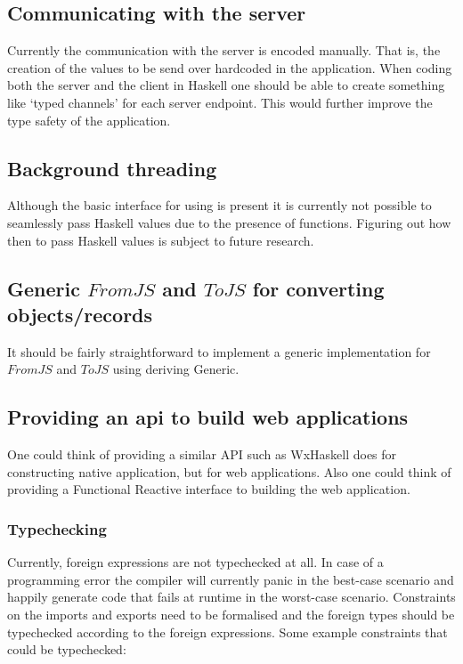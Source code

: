 \documentclass{llncs}
\newcommand{\Conid}[1]{\mathit{#1}}
\begin{document}
\label{future}

\subsection{Communicating with the server}\label{ssec:communicating-with-server}
Currently the communication with the server is encoded manually. That is, the
creation of the \js values to be send over hardcoded in the application. When
coding both the server and the client in Haskell one should be able to create
something like `typed channels' for each server endpoint. This would further
improve the type safety of the application.

\subsection{Background threading}
Although the basic interface for using  is present it is
currently not possible to seamlessly pass Haskell values due to the presence
of functions. Figuring out how then to pass Haskell values is subject to
future research.

\subsection{Generic \ensuremath{\Conid{FromJS}} and \ensuremath{\Conid{ToJS}} for converting objects/records}
It should be fairly straightforward to implement a generic implementation for
\ensuremath{\Conid{FromJS}} and \ensuremath{\Conid{ToJS}} using deriving Generic.

\subsection{Providing an api to build web applications}\label{ssec:providing-an-api-to-build-web-applications}
One could think of providing a similar API such as WxHaskell\cite{wxHaskell}
does for constructing native application, but for web applications. Also one
could think of providing a Functional
Reactive\cite{Elliott:2009:PFR:1596638.1596643,Wan:2000:FRP:349299.349331,reactive-banana}
interface to building the web application.

\subsubsection*{Typechecking}
Currently, foreign expressions are not typechecked at all. In case of a
programming error the compiler will currently panic in the best-case scenario
and happily generate \js code that fails at runtime in the worst-case scenario.
Constraints on the imports and exports need to be formalised and the foreign
types should be typechecked according to the foreign expressions. Some example
constraints that could be typechecked:
\end{document}
